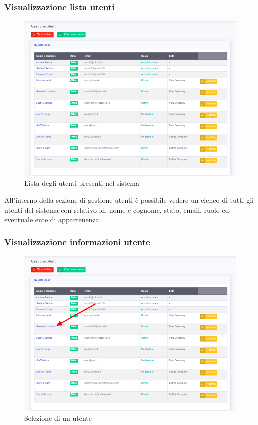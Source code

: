 	\subsubsection{Visualizzazione lista utenti}	
		\begin{figure}[H]
		\centering
		\includegraphics[scale=0.600]{res/images/admin/listaUtenti.png}
		\caption{Lista degli utenti presenti nel sistema}
	\end{figure}

		All'interno della sezione di gestione utenti è possibile vedere un elenco di tutti gli utenti del sistema con relativo id, nome e cognome, stato, email, ruolo ed eventuale ente di appartenenza. 

	\subsubsection{Visualizzazione informazioni utente}	

		\begin{figure}[H]
		\centering
		\includegraphics[scale=0.600]{res/images/admin/selDettUtente.png}
		\caption{Selezione di un utente}
	\end{figure}

